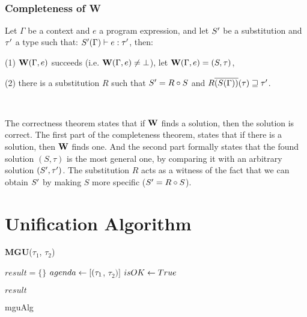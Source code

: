 \documentclass[a4paper,oneside]{memoir}
\begin{document}
~

\subsubsection{Completeness of W}

Let $\Gamma$ be a context and $e$ a program expression,
and let $S^\prime$ be a substitution and $\tau^\prime$ a type such that:
$ S^\prime(\Gamma) \vdash e : \tau^\prime $, 
then:

(1) $\operatorname{\textbf{W}}(\Gamma,e)$ succeeds (i.e. $\operatorname{\textbf{W}}(\Gamma,e) \neq \bot$), 
let $\operatorname{\textbf{W}}(\Gamma,e) = (S, \tau)$,

(2) there is a substitution $R$ such that $S^\prime = R \circ S$ 
and $R\overline{(S(\Gamma))}(\tau) \sqsupseteq \tau^\prime$. 

~ 

The correctness theorem states that if $\operatorname{\textbf{W}}$ finds a solution, then the solution is correct.
The first part of the completeness theorem, states that if there is a solution, then $\operatorname{\textbf{W}}$ finds one. And the second part formally states that the found solution $(S,\tau)$ is the most general one, by comparing it with an arbitrary solution $(S^\prime,\tau^\prime)$. The substitution $R$ acts as a witness of the fact that we can obtain $S^\prime$ by making $S$ more specific ($S^\prime = R \circ S$).  



\section{Unification Algorithm}

{\textbf{MGU}($\tau_1$, $\tau_2$)}{
	
	$result = \{\}$ \;
	$agenda \leftarrow [(\tau_1$, $\tau_2)]$ \;	
	$isOK \leftarrow True$ \;

	\;	
	
	\;
	
	 {
		\Return $result$
	} \Else {
		\Return $\bot$				
	}
	
}{mguAlg}
\end{document}
